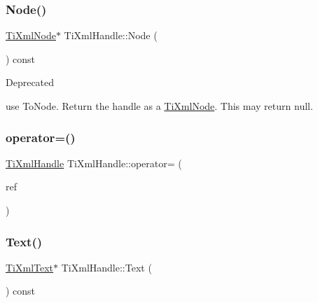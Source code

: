 \subsubsection{\texorpdfstring{Node()}{Node()}}
{\footnotesize\ttfamily \hyperlink{class_ti_xml_node}{Ti\+Xml\+Node}$\ast$ Ti\+Xml\+Handle\+::\+Node (\begin{DoxyParamCaption}{ }\end{DoxyParamCaption}) const\hspace{0.3cm}{\ttfamily [inline]}}

\begin{DoxyRefDesc}{Deprecated}
\item[\hyperlink{deprecated__deprecated000001}{Deprecated}]use To\+Node. Return the handle as a \hyperlink{class_ti_xml_node}{Ti\+Xml\+Node}. This may return null. \end{DoxyRefDesc}
\mbox{\label{class_ti_xml_handle_ad8e5dcf6a87882674203157f29f8e4db}} 
\subsubsection{\texorpdfstring{operator=()}{operator=()}}
{\footnotesize\ttfamily \hyperlink{class_ti_xml_handle}{Ti\+Xml\+Handle} Ti\+Xml\+Handle\+::operator= (\begin{DoxyParamCaption}\item[{const \hyperlink{class_ti_xml_handle}{Ti\+Xml\+Handle} \&}]{ref }\end{DoxyParamCaption})\hspace{0.3cm}{\ttfamily [inline]}}

\mbox{\label{class_ti_xml_handle_ad3b502c72059421e4dfcc7bda3c392fe}} 
\subsubsection{\texorpdfstring{Text()}{Text()}}
{\footnotesize\ttfamily \hyperlink{class_ti_xml_text}{Ti\+Xml\+Text}$\ast$ Ti\+Xml\+Handle\+::\+Text (\begin{DoxyParamCaption}{ }\end{DoxyParamCaption}) const\hspace{0.3cm}{\ttfamily [inline]}}

